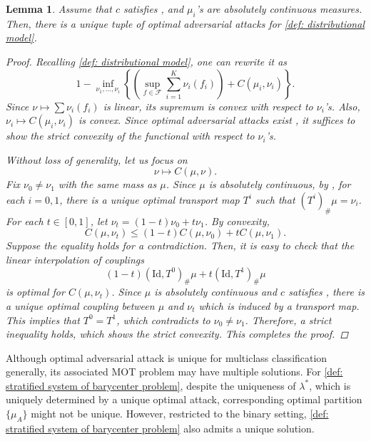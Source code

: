 \documentclass{amsart}
\theoremstyle{plain}
\numberwithin{equation}{section}\newtheorem{theorem}{Theorem}[section]
\newtheorem{lemma}[theorem]{Lemma}
\theoremstyle{remark}
\begin{document}
\begin{lemma}\label{lem: uniqueness of adversarial attack}
Assume that $c$ satisfies , and $\mu_i$'s are absolutely continuous measures. Then, there is a unique tuple of optimal adversarial attacks for \eqref{def: distributional model}.





\begin{proof}
Recalling \eqref{def: distributional model}, one can rewrite it as
\begin{equation}
    1 - \inf_{\nu_1, \dots, \nu_i} \left\{ \left( \sup_{f \in \mathcal{F}} \sum_{i=1}^K \nu_i(f_i)  \right) + C(\mu_i, \nu_i) \right\}.
\end{equation}
 Since $\nu \mapsto \sum \nu_i(f_i)$ is linear, its supremum is convex with respect to $\nu_i$'s. Also, $\nu_i \mapsto C(\mu_i, \nu_i)$ is convex. Since optimal adversarial attacks exist \cite[Proposition 7]{jakwang_MOT}, it suffices to show the strict convexity of the functional with respect to $\nu_i$'s. 


Without loss of generality, let us focus on
\[
    \nu \mapsto C(\mu, \nu).
\]
Fix $\nu_0 \neq \nu_1$ with the same mass as $\mu$. Since $\mu$ is absolutely continuous, by \cite[Theorem 2.4]{CLT_general_transport2024}, for each $i=0,1$, there is a unique optimal transport map $T^i$ such that $(T^i)_\# \mu = \nu_i$. For each $t \in [0,1]$, let $\nu_t = (1-t) \nu_0 + t \nu_1$. By convexity,
\[
    C(\mu, \nu_t) \leq (1-t)C(\mu, \nu_0) + t C(\mu, \nu_1).
\]
Suppose the equality holds for a contradiction. Then, it is easy to check that the linear interpolation of couplings
\[
    (1-t) (\mathrm{Id}, T^0)_\# \mu + t (\mathrm{Id}, T^1)_\# \mu 
\]
is optimal for $C(\mu, \nu_t)$. Since $\mu$ is absolutely continuous and $c$ satisfies , there is a unique optimal coupling between $\mu$ and $\nu_t$ which is induced by a transport map. This implies that $T^0=T^1$, which contradicts to $\nu_0 \neq \nu_1$. Therefore, a strict inequality holds, which shows the strict convexity. This completes the proof.
\end{proof}
\end{lemma}







Although optimal adversarial attack is unique for multiclass classification generally, its associated MOT problem may have multiple solutions. For \eqref{def: stratified system of barycenter problem}, despite the uniqueness of $\lambda^*$, which is uniquely determined by a unique optimal attack, corresponding optimal partition $\{ \mu_A \}$ might not be unique. However, restricted to the binary setting, \eqref{def: stratified system of barycenter problem} also admits a unique solution.
\end{document}
